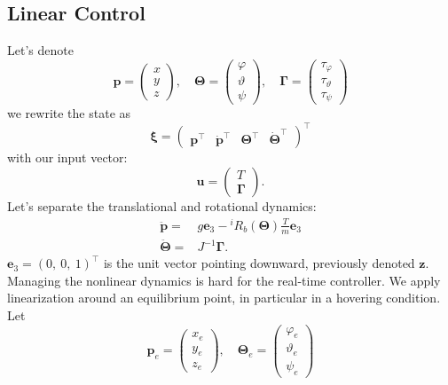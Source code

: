 \documentclass[10pt, a4paper]{report}
\newcommand{\y}{{\mathbf y}}
\begin{document}
\subsection{Linear Control}
Let's denote\begin{equation}
    \mathbf p=\begin{pmatrix}
        x\\y\\z 
    \end{pmatrix},\quad 
    \boldsymbol{\Theta}=\begin{pmatrix}
        \varphi\\\vartheta\\\psi
    \end{pmatrix},\quad \boldsymbol{\Gamma}=\begin{pmatrix}
        \tau_\varphi\\\tau_\vartheta\\\tau_\psi 
    \end{pmatrix}
\end{equation}
we rewrite the state as\begin{equation}
     \boldsymbol{\xi}=\begin{pmatrix}
        \mathbf p^\top&\dot {\mathbf p}^\top& \boldsymbol{\Theta}^\top&\dot{ \boldsymbol{\Theta}}^\top
     \end{pmatrix}^\top
\end{equation}
with our input vector:\begin{equation}
    \mathbf u = \begin{pmatrix}
        T\\ \boldsymbol{\Gamma}
    \end{pmatrix}.
\end{equation}
Let's separate the translational and rotational dynamics:\begin{align}
    \ddot{\mathbf p}=&g\mathbf e_3-{}^iR_b(\boldsymbol{\Theta})\frac{T}{m}\mathbf e_3\label{traslational_dynamic}\\ 
\ddot{\boldsymbol{\Theta}}=&J^{-1}\boldsymbol{\Gamma}. 
\end{align}
$\mathbf e_3=(0, \ 0, \ 1)^\top$ is the unit vector pointing downward, previously denoted $\mathbf z$.
Managing the nonlinear dynamics is hard for the real-time controller. We apply linearization around an equilibrium point, in particular in a hovering condition.
Let \begin{equation}
    \mathbf p_e=\begin{pmatrix}
        x_e\\y_e\\z_e
    \end{pmatrix},\quad 
    \boldsymbol{\Theta}_e=\begin{pmatrix}
        \varphi_e\\\vartheta_e\\\psi_e
    \end{pmatrix}
\end{equation}
\end{document}
